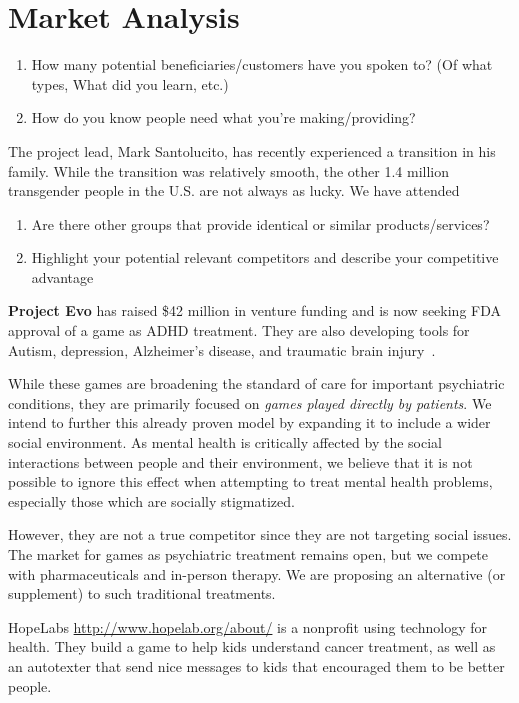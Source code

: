 

\section{Market Analysis} 
 
\begin{enumerate}
\itemsep-0.5em 
    \item How many potential beneficiaries/customers have you spoken to? (Of what types, What did you learn, etc.)
    \item How do you know people need what you’re making/providing?
\end{enumerate}

The project lead, Mark Santolucito, has recently experienced a transition in his family. While the transition was relatively smooth, the other 1.4 million transgender people in the U.S. are not always as lucky.
We have attended 

\begin{enumerate}
\itemsep-0.5em 
    \item Are there other groups that provide identical or similar products/services?
    \item Highlight your potential relevant competitors and describe your competitive advantage
\end{enumerate}

\textbf{Project Evo} has raised \$42 million in venture funding and is now seeking FDA approval of a game as ADHD treatment. They are also developing tools for Autism, depression, Alzheimer’s disease, and traumatic brain injury~\cite{akili}.

While these games are broadening the standard of care for important psychiatric conditions, they are primarily focused on {\it games played directly by patients}. We intend to further this already proven model by expanding it to include a wider social environment. As mental health is critically affected by the social interactions between people and their environment, we believe that it is not possible to ignore this effect when attempting to treat mental health problems, especially those which are socially stigmatized.


However, they are not a true competitor since they are not targeting social issues. The market for games as psychiatric treatment remains open, but we compete with pharmaceuticals and in-person therapy. We are proposing an alternative (or supplement) to such traditional treatments.

HopeLabs \url{http://www.hopelab.org/about/} is a nonprofit using technology for health. They build a game to help kids understand cancer treatment, as well as an autotexter that send nice messages to kids that encouraged them to be better people.